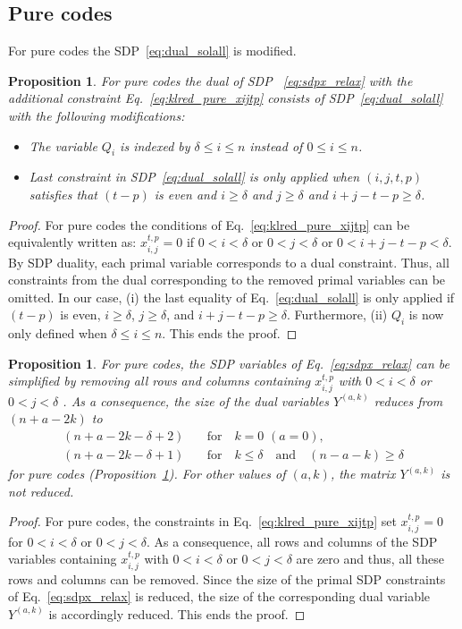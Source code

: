 \documentclass[12pt,a4paper]{amsart}
\newtheorem{proposition}[theorem]{Proposition}
\newcommand{\nn}{\nonumber}
\begin{document}
\subsection{Pure codes}
For pure codes the SDP~\eqref{eq:dual_solall} is modified.
% 
\begin{proposition}\label{rmk:dualpure}
    For pure codes 
    the dual of SDP 
~\eqref{eq:sdpx_relax} 
with the additional constraint
Eq.~\eqref{eq:klred_pure_xijtp} 
consists of SDP~\eqref{eq:dual_solall}
with the following modifications:

% 
\begin{itemize}
    \item[(i)] The variable $Q_i$ is indexed by $\delta \leq i \leq n$ 
    instead of $0 \leq i \leq n$.
    \item[(ii)] Last constraint in SDP~\eqref{eq:dual_solall} 
    is only applied when $(i,j,t,p)$ satisfies that $(t-p)$ is even and $i\geq \delta$ and $j\geq \delta$ and $i+j-t-p\geq \delta$.
\end{itemize}

\end{proposition}
\begin{proof}
For pure codes the conditions of Eq.~\eqref{eq:klred_pure_xijtp} can be equivalently written as: $x^{t,p}_{i,j} = 0$ if $0<i<\delta$ or $0<j<\delta$ or $0<i+j-t-p<\delta$. 
% 
By SDP duality, each primal variable corresponds to a dual constraint.
% 
Thus, all constraints from the dual corresponding to the removed primal variables can be omitted. 
% 
In our case, (i) the last equality of Eq.~\eqref{eq:dual_solall} is only applied if $(t-p)$ is even, $i\geq \delta$, $j\geq \delta$, and $i+j-t-p\geq \delta$.
% 
Furthermore, (ii) $Q_i$ is now only defined when $\delta \leq i \leq n$.  This ends the proof.
\end{proof}

% 
\begin{proposition}
For pure codes, the SDP variables of Eq.~\eqref{eq:sdpx_relax} can be simplified 
by removing all rows and columns containing $x^{t,p}_{i,j}$ with $0<i<\delta$ or $0<j<\delta$ .
% 
As a consequence, 
the size of the dual variables $Y^{(a,k)}$ reduces from $(n+a-2k)$ to 
\begin{align}
   (n+a-2k-\delta+2) \quad  &\text{for}  \quad k=0\,\, (a=0),\nn\\
    (n+a-2k-\delta+1) \quad  &\text{for}  \quad k\leq \delta \quad \text{and} \quad (n-a-k)\geq \delta
\end{align}
for pure codes (Proposition~\ref{rmk:dualpure}).
%
For other values of $(a,k)$, the matrix $Y^{(a,k)}$ is not reduced.
\end{proposition}
\begin{proof}
For pure codes, the constraints in Eq.~\eqref{eq:klred_pure_xijtp} set $x^{t,p}_{i,j}=0$ for $0< i<\delta$ or $0<j<\delta$. As a consequence, all  rows and columns of the SDP variables containing $x^{t,p}_{i,j}$
with $0< i<\delta$ or $0<j<\delta$ are zero and thus, all these rows and columns can be removed. Since the size of the primal SDP constraints of Eq.~\eqref{eq:sdpx_relax} is reduced, the size of the corresponding dual variable $Y^{(a,k)}$ is accordingly reduced. This ends the proof.
\end{proof}
\end{document}
